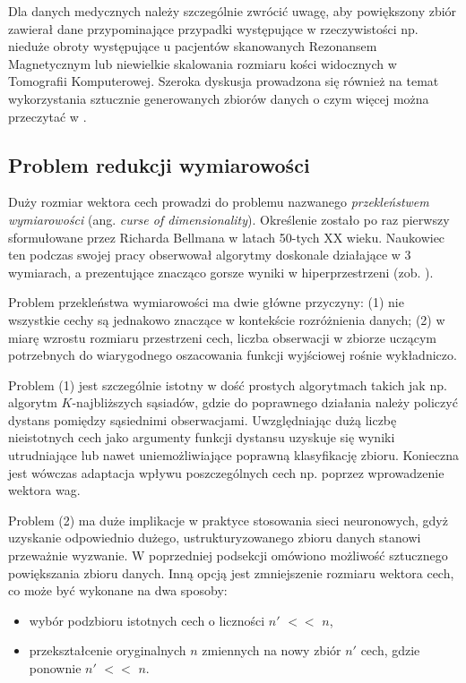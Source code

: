 Dla danych medycznych należy szczególnie zwrócić uwagę, aby powiększony zbiór zawierał dane przypominające przypadki występujące w rzeczywistości np. nieduże obroty występujące u pacjentów skanowanych Rezonansem Magnetycznym lub niewielkie skalowania rozmiaru kości widocznych w Tomografii Komputerowej. Szeroka dyskusja prowadzona się również na temat wykorzystania sztucznie generowanych zbiorów danych o czym więcej można przeczytać w \cite{DBLP:journals/corr/SixtWL16, Litjens2017}. 

\subsection{Problem redukcji wymiarowości}
\label{DimReduction}
Duży rozmiar wektora cech prowadzi do problemu nazwanego \textit{przekleństwem wymiarowości} (ang. \textit{curse of dimensionality}). Określenie zostało po raz pierwszy sformułowane przez Richarda Bellmana w latach 50-tych XX wieku. Naukowiec ten podczas swojej pracy obserwował algorytmy doskonale działające w 3 wymiarach, a prezentujące znacząco gorsze wyniki w hiperprzestrzeni (zob. \cite{Bellman:1957}). 

Problem przekleństwa wymiarowości ma dwie główne przyczyny: (1) nie wszystkie cechy są jednakowo znaczące w kontekście rozróżnienia danych; (2) w miarę wzrostu rozmiaru przestrzeni cech, liczba obserwacji w zbiorze uczącym potrzebnych do wiarygodnego oszacowania funkcji wyjściowej rośnie wykładniczo.  

Problem (1) jest szczególnie istotny w dość prostych algorytmach takich jak np. algorytm $K$-najbliższych sąsiadów, gdzie do poprawnego działania należy policzyć dystans pomiędzy sąsiednimi obserwacjami. Uwzględniając dużą liczbę nieistotnych cech jako argumenty funkcji dystansu uzyskuje się wyniki utrudniające lub nawet uniemożliwiające poprawną klasyfikację zbioru. Konieczna jest wówczas adaptacja wpływu poszczególnych cech np. poprzez wprowadzenie wektora wag.

Problem (2) ma duże implikacje w praktyce stosowania sieci neuronowych, gdyż uzyskanie odpowiednio dużego, ustrukturyzowanego zbioru danych stanowi przeważnie wyzwanie. W poprzedniej podsekcji omówiono możliwość sztucznego powiększania zbioru danych. Inną opcją jest zmniejszenie rozmiaru wektora cech, co może być wykonane na dwa sposoby:

\begin{itemize}[noitemsep,nolistsep]
\item wybór podzbioru istotnych cech o liczności $n'$ $<<$ $n$,
\item przekształcenie oryginalnych $n$ zmiennych na nowy zbiór $n'$ cech, gdzie ponownie $n'$ $<<$ $n$.
\end{itemize}

